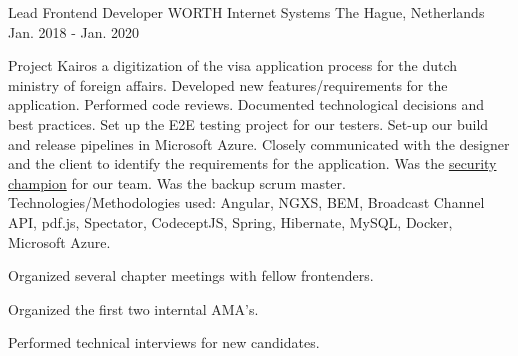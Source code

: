 

\begin{cventries}

  \cventry
    {Lead Frontend Developer} %
    {WORTH Internet Systems} %
    {The Hague, Netherlands} %
    {Jan. 2018 - Jan. 2020} %
    {
      \begin{cvitems} %
          \item {
          	  Project Kairos a digitization of the visa application process for the dutch ministry of foreign affairs.
   		  	  \newline
   		  	  Developed new features/requirements for the application.
   		  	  \newline
   		  	  Performed code reviews.
   		  	  \newline
 		  	  Documented technological decisions and best practices.
   		  	  \newline
   		  	  Set up the E2E testing project for our testers.
   		  	  \newline
   		  	  Set-up our build and release pipelines in Microsoft Azure.
   		  	  \newline
    		  Closely communicated with the designer and the client to identify the requirements for the application.
   		  	  \newline
 		  	  Was the \href{https://worth.systems/insight/security-champions}{security champion} for our team.
   		  	  \newline
    	  	  Was the backup scrum master.
    		  \newline
  			  Technologies/Methodologies used: Angular, NGXS, BEM, Broadcast Channel API, pdf.js, Spectator, CodeceptJS, Spring, Hibernate, MySQL, Docker, Microsoft Azure.
     	  }
	      \item {
	          Organized several chapter meetings with fellow frontenders.
	      }
	      \item {
	          Organized the first two interntal AMA's.
	      }
  	      \item {
	      	  Performed technical interviews for new candidates.
	      }
      \end{cvitems}
    }


\end{cventries}
